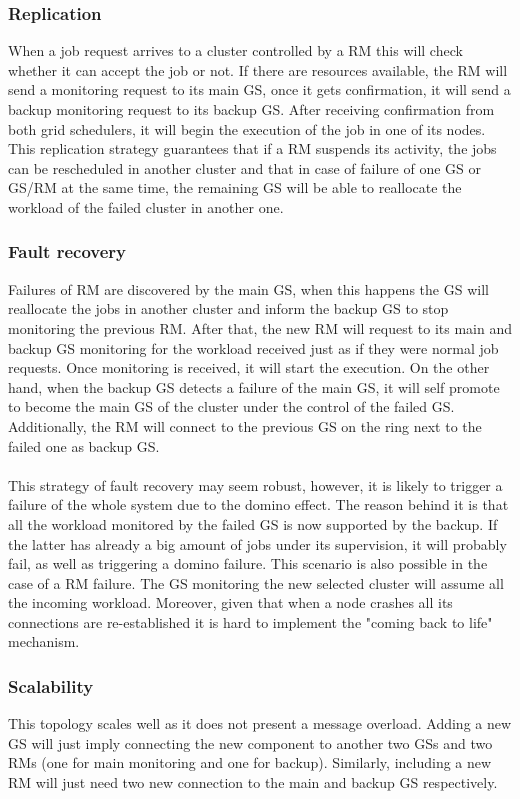 \subsubsection{Replication}
When a job request arrives to a cluster controlled by a RM this will check whether it can accept the job or not. If there are resources available, the RM will send a monitoring request to its main GS, once it gets confirmation, it will send a backup monitoring request to its backup GS. After receiving confirmation from both grid schedulers, it will begin the execution of the job in one of its nodes. This replication strategy guarantees that if a RM suspends its activity, the jobs can be rescheduled in another cluster and that in case of failure of one GS or GS/RM at the same time, the remaining GS will be able to reallocate the workload of the failed cluster in another one.

\subsubsection{Fault recovery}
Failures of RM are discovered by the main GS, when this happens the GS will reallocate the jobs in another cluster and inform the backup GS to stop monitoring the previous RM. After that, the new RM will request to its main and backup GS monitoring for the workload received just as if they were normal job requests. Once monitoring is received, it will start the execution.
On the other hand, when the backup GS detects a failure of the main GS, it will self promote to become the main GS of the cluster under the control of the failed GS. Additionally, the RM will connect to the previous GS on the ring next to the failed one as backup GS.
\\\\
This strategy of fault recovery may seem robust, however, it is likely to trigger a failure of the whole system due to the domino effect. The reason behind it is that all the workload monitored by the failed GS is now supported by the backup. If the latter has already a big amount of jobs under its supervision, it will probably fail, as well as triggering a domino failure. This scenario is also possible in the case of a RM failure. The GS monitoring the new selected cluster will assume all the incoming workload. Moreover, given that when a node crashes all its connections are re-established it is hard to implement the "coming back to life" mechanism.

\subsubsection{Scalability}
This topology scales well as it does not present a message overload. Adding a new GS will just imply connecting the new component to another two GSs and two RMs (one for main monitoring and one for backup). Similarly, including a new RM will just need two new connection to the main and backup GS respectively.

